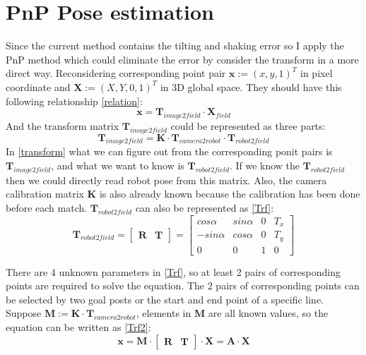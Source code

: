\section{PnP Pose estimation}
Since the current method contains the tilting and shaking error so I apply the PnP method \cite{ETHPnP} which could eliminate the error by consider the transform in a more direct way. Reconsidering corresponding point pair $\mathbf{x}:=(x,y,1)^T$ in pixel coordinate and $\mathbf{X}:=(X,Y,0,1)^T$ in 3D global space. They should have this following relationship \eqref{relation}:
\begin{equation}
\mathbf{x} = \mathbf{T}_{image2field} \cdot \mathbf{X}_{field} \label{relation}
\end{equation}
And the transform matrix $\mathbf{T}_{image2field}$ could be represented as three parts: 
\begin{equation}
\mathbf{T}_{image2field}=\mathbf{K} \cdot \mathbf{T}_{camera2robot} \cdot \mathbf{T}_{robot2field} \label{transform}
\end{equation}
In \eqref{transform} what we can figure out from the corresponding ponit pairs is $\mathbf{T}_{image2field}$, and what we want to know is $\mathbf{T}_{robot2field}$. If we know the $\mathbf{T}_{robot2field}$ then we could directly read robot pose from this matrix. Also, the camera calibration matrix $\mathbf{K}$ is also already known because the calibration has been done before each match. 
$\mathbf{T}_{robot2field}$ can also be represented as \eqref{Trf}:
\begin{equation}\mathbf{T}_{robot2field}=
\begin{bmatrix}
\mathbf{R} & \mathbf{T}
\end{bmatrix}=
\begin{bmatrix}
cos\alpha & sin\alpha & 0 & T_x\\
-sin\alpha & cos\alpha & 0 & T_y\\
0 & 0 & 1 & 0
\end{bmatrix} \label{Trf}
\end{equation}

There are 4 unknown parameters in \eqref{Trf}, so at least 2 pairs of corresponding points are required to solve the equation. The 2 pairs of corresponding points can be selected by two goal posts or the start and end point of a specific line. Suppose $\mathbf{M}:=\mathbf{K} \cdot \mathbf{T}_{camera2robot}$, elements in $\mathbf{M}$ are all known values, so the equation can be written as \eqref{Trf2}:
\begin{equation}\mathbf{x}=\mathbf{M} \cdot
\begin{bmatrix}
\mathbf{R} & \mathbf{T}
\end{bmatrix} \cdot \mathbf{X} =\mathbf{A}\cdot \mathbf{X}
\label{Trf2}
\end{equation}

